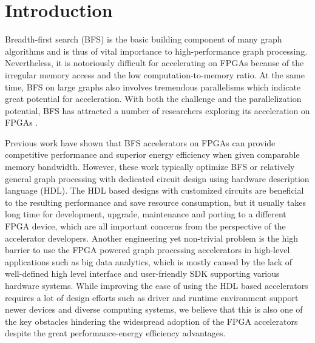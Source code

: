 \section{Introduction} \label{sec:intro}
 
Breadth-first search (BFS) is the basic building component of many graph algorithms 
and is thus of vital importance to high-performance graph processing. Nevertheless, 
it is notoriously difficult for accelerating on FPGAs because of the 
irregular memory access and the low 
computation-to-memory ratio. At the same time, BFS on large graphs also involves 
tremendous parallelisms which indicate great potential for acceleration. 
With both the challenge and the parallelization potential, 
BFS has attracted a number of researchers exploring its acceleration on FPGAs 
\cite{attia2014cygraph, betkaoui2012reconfigurable, Dai2017foregraph, Ma2017fpga,
umuroglu2015hybrid, oguntebi2016graphops, engelhardt2016gravf, zhou2016high}. 

Previous work have shown that BFS accelerators on FPGAs can provide competitive  
performance and superior energy efficiency when given comparable memory bandwidth. 
However, these work typically optimize BFS or relatively general graph processing 
with dedicated circuit design using hardware description language (HDL). The HDL 
based designs with customized circuits are beneficial to the resulting performance 
and save resource consumption, but it usually takes long time for development, 
upgrade, maintenance and porting to a different FPGA device, which are all 
important concerns from the perspective of the accelerator developers. Another 
engineering yet non-trivial problem is the high barrier to use the FPGA powered graph 
processing accelerators in high-level applications such as 
big data analytics, which is mostly caused by the lack of 
well-defined high level interface and user-friendly SDK supporting 
various hardware systems. While improving the ease of using the 
HDL based accelerators requires a lot of design efforts 
such as driver and runtime environment support newer 
devices and diverse computing systems, we believe 
that this is also one of the key obstacles hindering the 
widespread adoption of the FPGA accelerators despite the great 
performance-energy efficiency advantages.

